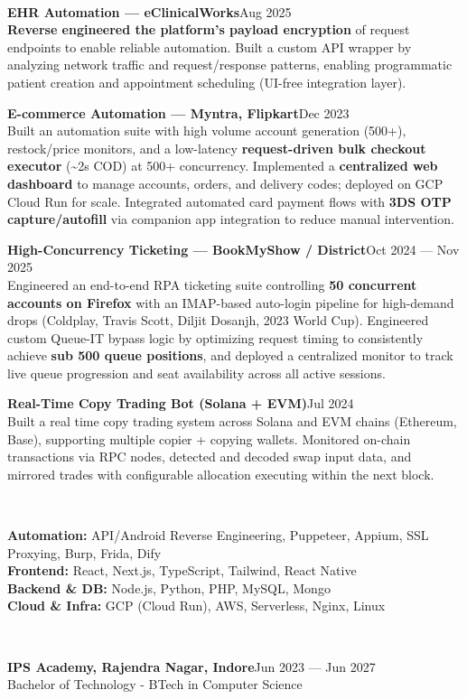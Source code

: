 \documentclass[10pt]{article}
\newcommand{\bluerule}{\noindent{\color{accent}\rule{\linewidth}{0.6pt}}}
\newcommand{\sectionhead}[1]{%
  \vspace{8pt}%
  \noindent{\color{accent}\textbf{\large\MakeUppercase{#1}}}%
  \\[-5pt]%
  \bluerule%
  \vspace{6pt}%
}
\newcommand{\entryhead}[2]{%
  \noindent\textbf{#1}\hfill #2\\%
}
\begin{document}
\sectionhead{Freelance Projects}
\entryhead{EHR Automation --- eClinicalWorks}{Aug 2025}
\textbf{Reverse engineered the platform's payload encryption} of request endpoints to enable reliable automation. Built a custom API wrapper by analyzing network traffic and request/response patterns, enabling programmatic patient creation and appointment scheduling (UI-free integration layer).

\vspace{4pt}
\entryhead{E-commerce Automation --- Myntra, Flipkart}{Dec 2023}
Built an automation suite with high volume account generation (500+), restock/price monitors, and a low-latency \textbf{request-driven bulk checkout executor} (\textasciitilde{}2s COD) at 500+ concurrency. Implemented a \textbf{centralized web dashboard} to manage accounts, orders, and delivery codes; deployed on GCP Cloud Run for scale. Integrated automated card payment flows with \textbf{3DS OTP capture/autofill} via companion app integration to reduce manual intervention.

\vspace{4pt}
\entryhead{High-Concurrency Ticketing --- BookMyShow / District}{Oct 2024 --- Nov 2025}
Engineered an end-to-end RPA ticketing suite controlling \textbf{50 concurrent accounts on Firefox} with an IMAP-based auto-login pipeline for high-demand drops (Coldplay, Travis Scott, Diljit Dosanjh, 2023 World Cup). Engineered custom Queue-IT bypass logic by optimizing request timing to consistently achieve \textbf{sub 500 queue positions}, and deployed a centralized monitor to track live queue progression and seat availability across all active sessions.

\vspace{4pt}
\entryhead{Real-Time Copy Trading Bot (Solana + EVM)}{Jul 2024}
Built a real time copy trading system across Solana and EVM chains (Ethereum, Base), supporting multiple copier + copying wallets. Monitored on-chain transactions via RPC nodes, detected and decoded swap input data, and mirrored trades with configurable allocation executing within the next block.

\sectionhead{Skills}
\textbf{Automation:} API/Android Reverse Engineering, Puppeteer, Appium, SSL Proxying, Burp, Frida, Dify\\[1pt]
\textbf{Frontend:} React, Next.js, TypeScript, Tailwind, React Native\\[1pt]
\textbf{Backend \& DB:} Node.js, Python, PHP, MySQL, Mongo\\[1pt]
\textbf{Cloud \& Infra:} GCP (Cloud Run), AWS, Serverless, Nginx, Linux

\sectionhead{Education}
\entryhead{IPS Academy, Rajendra Nagar, Indore}{Jun 2023 --- Jun 2027}Bachelor of Technology - BTech in Computer Science
\end{document}
